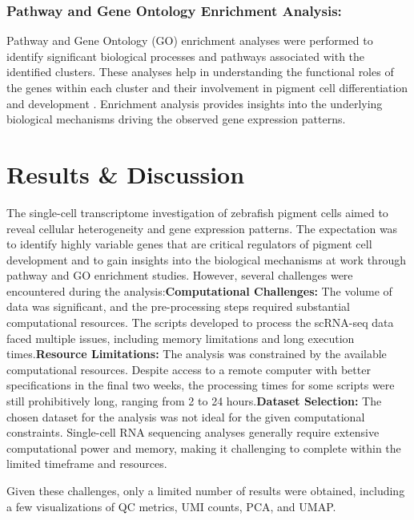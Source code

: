 \documentclass[runningheads]{llncs}
\begin{document}
\subsubsection{Pathway and Gene Ontology Enrichment Analysis:} Pathway and Gene Ontology (GO) enrichment analyses were performed to identify significant biological processes and pathways associated with the identified clusters. These analyses help in understanding the functional roles of the genes within each cluster and their involvement in pigment cell differentiation and development \cite{kenny2022tfap2}. Enrichment analysis provides insights into the underlying biological mechanisms driving the observed gene expression patterns.

\section{Results \& Discussion}

The single-cell transcriptome investigation of zebrafish pigment cells aimed to reveal cellular heterogeneity and gene expression patterns. The expectation was to identify highly variable genes that are critical regulators of pigment cell development and to gain insights into the biological mechanisms at work through pathway and GO enrichment studies. However, several challenges were encountered during the analysis:\newline\textbf{Computational Challenges:} The volume of data was significant, and the pre-processing steps required substantial computational resources. The scripts developed to process the scRNA-seq data faced multiple issues, including memory limitations and long execution times.\newline\textbf{Resource Limitations:} The analysis was constrained by the available computational resources. Despite access to a remote computer with better specifications in the final two weeks, the processing times for some scripts were still prohibitively long, ranging from 2 to 24 hours.\newline\textbf{Dataset Selection:} The chosen dataset for the analysis was not ideal for the given computational constraints. Single-cell RNA sequencing analyses generally require extensive computational power and memory, making it challenging to complete within the limited timeframe and resources.

Given these challenges, only a limited number of results were obtained, including a few visualizations of QC metrics, UMI counts, PCA, and UMAP.
\end{document}
